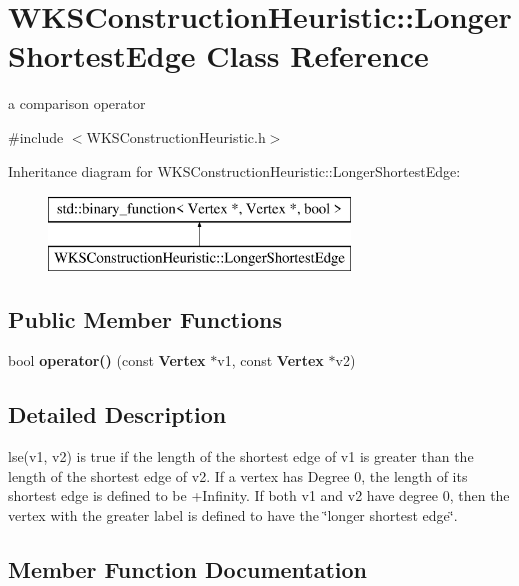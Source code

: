 \section{W\+K\+S\+Construction\+Heuristic\+:\+:Longer\+Shortest\+Edge Class Reference}
\label{classWKSConstructionHeuristic_1_1LongerShortestEdge}


a comparison operator  




{\ttfamily \#include $<$W\+K\+S\+Construction\+Heuristic.\+h$>$}

Inheritance diagram for W\+K\+S\+Construction\+Heuristic\+:\+:Longer\+Shortest\+Edge\+:\begin{figure}[H]
\begin{center}
\leavevmode
\includegraphics[height=2.000000cm]{classWKSConstructionHeuristic_1_1LongerShortestEdge}
\end{center}
\end{figure}
\subsection*{Public Member Functions}
\begin{DoxyCompactItemize}
\item 
bool \textbf{ operator()} (const \textbf{ Vertex} $\ast$v1, const \textbf{ Vertex} $\ast$v2)
\end{DoxyCompactItemize}


\subsection{Detailed Description}
lse(v1, v2) is true if the length of the shortest edge of v1 is greater than the length of the shortest edge of v2. If a vertex has Degree 0, the length of its shortest edge is defined to be +\+Infinity. If both v1 and v2 have degree 0, then the vertex with the greater label is defined to have the \char`\"{}longer shortest edge\char`\"{}. 

\subsection{Member Function Documentation}
\mbox{\label{classWKSConstructionHeuristic_1_1LongerShortestEdge_ae3ea58e171cf43e75e217d4c15657244}} 
